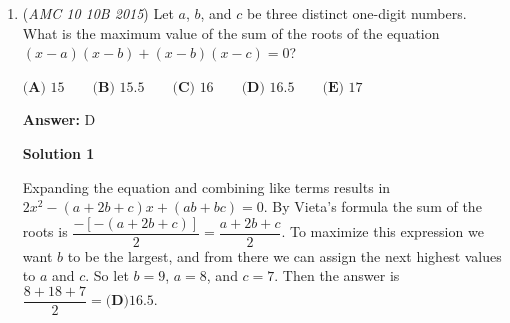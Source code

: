 \begin{enumerate}
 



\textbf{Solution 2 (very similar to Solution 1)}

Noticing that the line has coefficients $12$ and $5$, we can suspect that we have a $5$-$12$-$13$ triangle on our hands. Because we want the sum of the altitudes, the third altitude that is not an axis must have a denominator of $13$. Since the other altitudes are integers, we choose the option with $13$ as the denominator, namely $E$.

 



\textbf{Solution 3 (point to line distance formula)}

Similar to the above solutions, we find that the three vertices of the triangle are $(0, 0)$, $(0, 12)$, and $(5, 0)$.We already know the length of two of the altitudes (12 and 5 respectively). To find the third altitude we use the formula for a point to a line:

 $d = \frac{|Ax_0 + By_0 + C|}{\sqrt{A^2 + B^2}}$ for the point $(x_0, y_0)$ and the line in the form of $Ax + By + C = 0$.

 Using this formula we plug in the known values:
 \[d = \frac{|12 \cdot 0 + 5 \cdot 0 - 60|}{\sqrt{12^2 + 5^2}}\]
 \[d = \frac{|-60|}{\sqrt{169}}\]
 \[d = \frac{60}{13}\]

 At this point, we are likely already able to guess that the answer choice is $\frac{281}{13}$, because it is the only choice with the denominator being 13. But, we can still confirm this, just in case, by summing up the three heights:
 \[12 + 5 + \frac{60}{13} = \frac{156}{13} + \frac{65}{13} + \frac{60}{13} = \boxed{\frac{281}{13}}\]



	\item (\textit{AMC 10 10B 2015}) Let $a$, $b$, and $c$ be three distinct one-digit numbers. What is the maximum value of the sum of the roots of the equation $(x-a)(x-b)+(x-b)(x-c)=0$?


 $\textbf{(A) } 15 \qquad\textbf{(B) } 15.5 \qquad\textbf{(C) } 16 \qquad\textbf{(D) } 16.5 \qquad\textbf{(E) } 17$

 \textbf{Answer: }D



\textbf{Solution 1}

Expanding the equation and combining like terms results in $2x^2-(a+2b+c)x+(ab+bc)=0$. By Vieta's formula the sum of the roots is $\dfrac{-[-(a+2b+c)]}{2}=\dfrac{a+2b+c}{2}$. To maximize this expression we want $b$ to be the largest, and from there we can assign the next highest values to $a$ and $c$. So let $b=9$, $a=8$, and $c=7$. Then the answer is $\dfrac{8+18+7}{2}=\boxed{\textbf{(D)} 16.5}$.


\end{enumerate}
